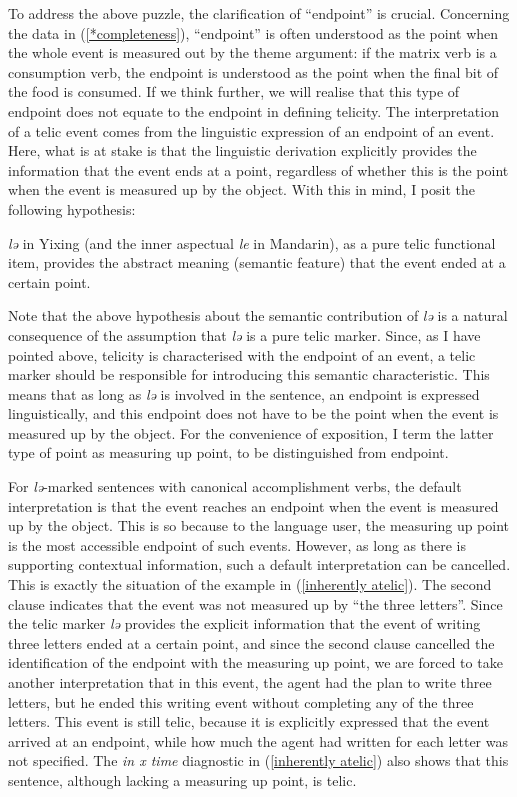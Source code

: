 \documentclass[output=paper]{langsci/langscibook}
\begin{document}
To address the above puzzle, the clarification of ``endpoint'' is crucial.
Concerning the data in (\ref{*completeness}), ``endpoint'' is often understood as
the point when the whole event is measured out by the theme argument: if the
matrix verb is a consumption verb, the endpoint is understood as the point when
the final bit of the food is consumed. If we think further, we will realise
that this type of endpoint does not equate to the endpoint in defining
telicity.  The interpretation of a telic event comes from the linguistic
expression of an endpoint of an event. Here, what is at stake is that the
linguistic derivation explicitly provides the information that the event ends
at a point, regardless of whether this is the point when the event is measured
up by the object. With this in mind, I posit the following hypothesis:

\begin{exe}
\ex\label{le hypothesis} \emph{lə} in Yixing (and the inner aspectual \emph{le} in Mandarin), as a pure telic functional item, provides the abstract meaning (semantic feature) that the event ended at a certain point.
\end{exe}

Note that the above hypothesis about the semantic contribution of \emph{lə} is a natural consequence of the assumption that \emph{lə} is a pure telic marker. Since, as I have pointed above, telicity is characterised with the endpoint of an event, a telic marker should be responsible for introducing this semantic characteristic. This means that as long as \emph{lə} is involved in the sentence, an endpoint is expressed linguistically, and this endpoint does not have to be the point when the event is measured up by the object. For the convenience of exposition, I term the latter type of point as measuring up point, to be distinguished from endpoint.\largerpage[-2]


For \emph{lə}-marked sentences with canonical accomplishment verbs, the default
interpretation is that the event reaches an endpoint when the event is measured
up by the object. This is so because to the language user, the measuring up
point is the most accessible endpoint of such events. However, as long as there
is supporting contextual information, such a default interpretation can be
cancelled. This is exactly the situation of the example in (\ref{inherently
atelic}). The second clause indicates that the event was not measured up by
\enquote{the three letters}. Since the telic marker \emph{lə} provides the explicit
information that the event of writing three letters ended at a certain point,
and since the second clause cancelled the identification of the endpoint with
the measuring up point, we are forced to take another interpretation that in
this event, the agent had the plan to write three letters, but he ended this
writing event without completing any of the three letters. This event is still
telic, because it is explicitly expressed that the event arrived at an
endpoint, while how much the agent had written for each letter was not
specified. The \emph{in x time} diagnostic in (\ref{inherently atelic}) also
shows that this sentence, although lacking a measuring up point, is telic.
\end{document}
